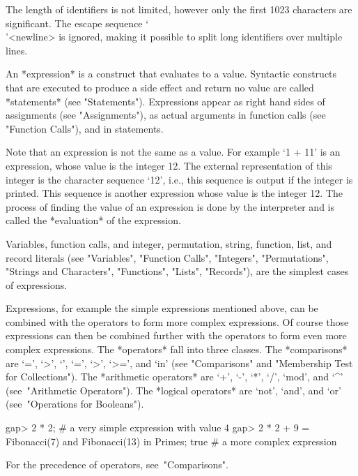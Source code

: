 {The length of identifiers is not limited,  however only the first 1023
characters are significant. The escape sequence `\\'<newline> is ignored,
making it possible to split long identifiers over multiple lines.


An *expression* is a construct that evaluates to a value.  Syntactic
constructs that are executed to produce a side effect and return no value
are called *statements* (see "Statements"). Expressions appear as right
hand sides of assignments (see "Assignments"), as actual arguments in
function calls (see "Function Calls"), and in statements.

Note that an expression is not the same as a value. For example `1 + 11'
is an  expression, whose value is  the  integer 12.  The external
representation of this integer is the character sequence `12', i.e., this
sequence is output if the integer is printed. This sequence is another
expression whose value is the integer 12.  The process of finding the
value of an expression is done by the interpreter and is called the
*evaluation* of the expression.

Variables, function calls, and integer, permutation, string, function,
list, and record literals (see "Variables", "Function Calls", "Integers",
"Permutations",  "Strings  and  Characters",  "Functions",  "Lists",
"Records"), are the simplest cases of expressions.

Expressions, for example the simple expressions mentioned above, can be
combined with the operators to form more complex expressions. Of course
those expressions can then be combined further with the operators to form
even more complex expressions. The *operators* fall into three classes.%
The *comparisons* are `=', `\<>', `\<', `\<=', `>',  `>=', and `in' (see
"Comparisons" and "Membership Test for Collections").
The *arithmetic operators* are `+', `-', `*',
`/', `mod', and `^' (see~"Arithmetic Operators").
The *logical operators* are `not', `and', and `or'
(see~"Operations for Booleans").

\beginexample
gap> 2 * 2;  # a very simple expression with value
4
gap> 2 * 2 + 9 = Fibonacci(7) and Fibonacci(13) in Primes;
true      # a more complex expression
\endexample

For the precedence of operators, see~"Comparisons".


}
